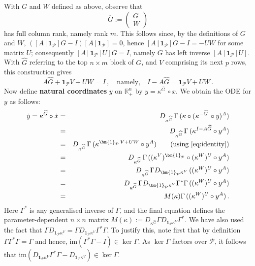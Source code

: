 \documentclass[11pt]{amsart}
\renewcommand{\k}{\kappa}
\newcommand{\R}{\mathbb{R}}
\newcommand{\wG}{\widehat{G}}
\newcommand{\mP}{\mathcal{P}}
\theoremstyle{definition}
\begin{document}
With $G$ and $W$ defined as above, observe that 
\[
\overline{G} := \left(\begin{array}{c}G\\W\end{array}\right)
\]
has full column rank, namely rank $m$. This follows since, by the definitions of $G$ and $W$, $([A\,|\,\bm{1}_{\mP}]G-I)[A\,|\,\bm{1}_{\mP}]=0$, hence $[A\,|\,\bm{1}_{\mP}]G-I = -UW$ for some matrix $U$; consequently $[A\,|\,\bm{1}_{\mP}\,|\,U]\overline{G} = I$, namely $\overline{G}$ has left inverse $[A\,|\,\bm{1}_{\mP}\,|\,U]$. With $\wG$ referring to the top $n \times m$ block of $G$, and $V$ comprising its next $p$ rows, this construction gives
\begin{equation}\label{eq:identity}
A\wG + \bm{1}_\mP V + UW = I\,, \quad \mbox{namely,} \quad I-A\wG=\bm{1}_\mP V + UW\,.
\end{equation}
Now define {\bf natural coordinates} $y$ on $\R^n_+$ by $y = \k^{\wG}\,\circ x$. We obtain the ODE for $y$ as follows:
\begin{eqnarray*}
  \dot y = \k^{\wG} \circ \dot x
         & = & D_{\k^{\wG}}\,\Gamma\,(\k \circ (\k^{-\wG}\,\circ y)^A)\\
         & = & D_{\k^{\wG}}\,\Gamma\,(\k^{I-A\wG} \circ y^A)\\
         & = & D_{\k^{\wG}}\,\Gamma\,(\k^{\bm{1}_{\mP}\,V + UW} \circ y^A) \qquad \mbox{(using \eqref{eq:identity})}\\
  & = & D_{\k^{\wG}}\,\Gamma\,((\k^V)^{\bm{1}_{\mP}} \circ (\k^W)^U \circ y^A)\\
  & = & D_{\k^{\wG}}\,\Gamma D_{\bm{1}_{\mP}\k^V}\,((\k^W)^U \circ y^A)\\
    & = & D_{\k^{\wG}}\,\Gamma D_{\bm{1}_{\mP}\k^V} \Gamma^* \Gamma \,((\k^W)^U \circ y^A)\\
    &=& M(\kappa) \Gamma \,((\k^W)^U \circ y^A)\,.
\end{eqnarray*}
Here $\Gamma^*$ is any generalised inverse of $\Gamma$, and the final equation defines the parameter-dependent $n \times n$ matrix $M(\kappa):= D_{\k^{\wG}}\Gamma D_{\bm{1}_{\mP}\k^V} \Gamma^*$. We have also used the fact that $\Gamma D_{\bm{1}_{\mP}\k^V} = \Gamma D_{\bm{1}_{\mP}\k^V} \Gamma^* \Gamma$. To justify this, note first that by definition $\Gamma \Gamma^* \Gamma = \Gamma$ and hence, $\mathrm{im}(\Gamma^* \Gamma - I) \in \ker \Gamma$. As $\ker \Gamma$ factors over $\mP$, it follows that $\mathrm{im}(D_{\bm{1}_{\mP}\k^V} \Gamma^* \Gamma - D_{\bm{1}_{\mP}\k^V}) \in \ker \Gamma$. 
\end{document}
